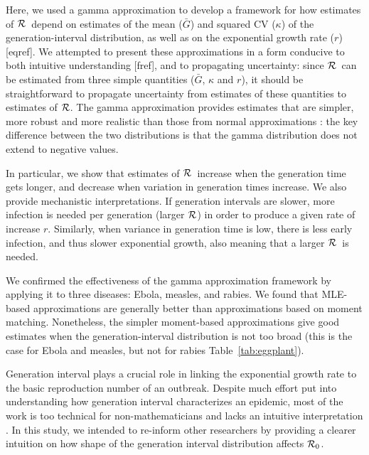 \documentclass[12pt,]{article}
\newcommand{\RR}{\ensuremath{{\cal R}}}
\newcommand{\Rx}[1]{\ensuremath{{\cal R}_{#1}}}
\newcommand{\Ro}{\Rx{0}}
\newcommand{\tref}[1]{Table~\ref{tab:#1}}
\begin{document}
Here, we used a gamma approximation \cite{NishCast09} to develop a framework for how estimates of \RR\ depend on estimates of the mean ($\bar G$) and squared CV ($\kappa$) of the generation-interval distribution, as well as on the exponential growth rate ($r$) [eqref]. 
We attempted to present these approximations in a form conducive to both intuitive understanding [fref], and to propagating uncertainty: since \RR\ can be estimated from three simple quantities ($\bar G$, $\kappa$ and $r$), it should be straightforward to propagate uncertainty from estimates of these quantities to estimates of \RR.
The gamma approximation provides estimates that are simpler, more robust and more realistic than those from normal approximations \cite{WallLips07}:
the key difference between the two distributions is that the gamma distribution does not extend to negative values.

In particular, we show that estimates of \RR\ increase when the generation time gets longer, and decrease when variation in generation times increase. We also provide mechanistic interpretations. If generation intervals are slower, more infection is needed per generation (larger \RR)  in order to produce a given rate of increase $r$. Similarly, when variance in generation time is low, there is less early infection, and thus slower exponential growth, also meaning that a larger \RR\ is needed. 

We confirmed the effectiveness of the gamma approximation framework by applying it to three diseases: Ebola, measles, and rabies. 
We found that MLE-based approximations are generally better than approximations based on moment matching. Nonetheless, the simpler moment-based approximations give good estimates when the generation-interval distribution is not too broad (this is the case for Ebola and measles, but not for rabies \tref{eggplant}). 


Generation interval plays a crucial role in linking the exponential growth rate to the basic reproduction number of an outbreak.
Despite much effort put into understanding how generation interval characterizes an epidemic, most of the work is too technical for non-mathematicians and lacks an intuitive interpretation \cite{WallLips07,Sven07,Sven15,Nish10}.
In this study, we intended to re-inform other researchers by providing a clearer intuition on how shape of the generation interval distribution affects \Ro.
\end{document}
